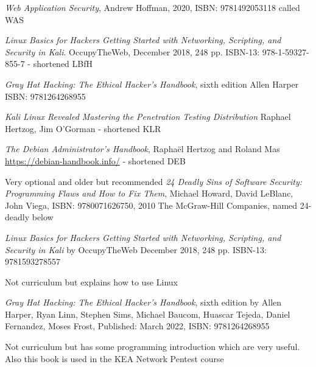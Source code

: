 \documentclass[Screen16to9,17pt]{foils}
\begin{document}
\emph{Web Application Security}, Andrew Hoffman, 2020, ISBN: 9781492053118 called WAS


 \begin{list2}
 \item \emph{Linux Basics for Hackers Getting Started with Networking, Scripting, and Security in Kali}. OccupyTheWeb, December 2018, 248 pp. ISBN-13: 978-1-59327-855-7 - shortened LBfH
\item \emph{Gray Hat Hacking: The Ethical Hacker's Handbook}, sixth edition Allen Harper ISBN: 9781264268955
 \item \emph{Kali Linux Revealed  Mastering the Penetration Testing Distribution}
 Raphael Hertzog, Jim O'Gorman - shortened KLR
 \item \emph{The Debian Administrator’s Handbook}, Raphaël Hertzog and Roland Mas\\
 \url{https://debian-handbook.info/} - shortened DEB
 \vskip 1cm
 \item Very optional and older but recommended \emph{24 Deadly Sins of Software Security: Programming Flaws and How to Fix Them}, Michael Howard, David LeBlanc, John Viega, ISBN: 9780071626750, 2010 The McGraw-Hill Companies, named 24-deadly below
 \end{list2}



\emph{Linux Basics for Hackers
Getting Started with Networking, Scripting, and Security in Kali}
by OccupyTheWeb
December 2018, 248 pp.
ISBN-13:
9781593278557

Not curriculum but explains how to use Linux



\emph{Gray Hat Hacking: The Ethical Hacker's Handbook}, sixth edition
by Allen Harper, Ryan Linn, Stephen Sims, Michael Baucom, Huascar Tejeda, Daniel Fernandez, Moses Frost, Published: March 2022, ISBN: 9781264268955

Not curriculum but has some programming introduction which are very useful.
Also this book is used in the KEA Network Pentest course



\end{document}
